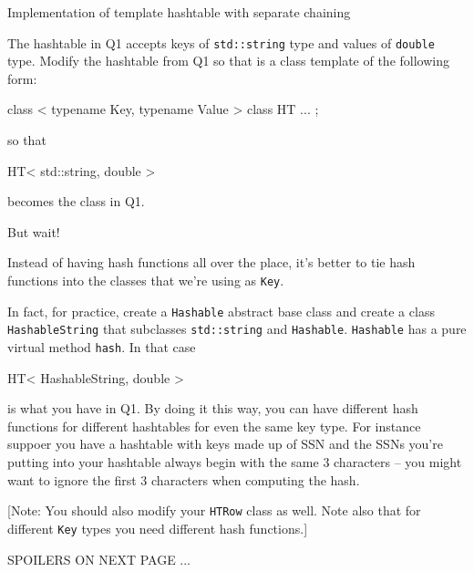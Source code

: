 Implementation of template hashtable with separate chaining

The hashtable in Q1 accepts keys of \verb!std::string! type
and values of \verb!double! type.
Modify the hashtable from Q1 so that is a class template of the following
form:
\begin{console}
class < typename Key, typename Value >
class HT
{
    ...
};
\end{console}
so that
\begin{console}
HT< std::string, double >
\end{console}
becomes the class in Q1.

But wait!

Instead of having hash functions all over the place, it's better to tie
hash functions into the classes that we're using as \verb!Key!.

In fact, for practice, create a \verb!Hashable! abstract base class
and create a class \verb!HashableString! that subclasses
\verb!std::string! and \verb!Hashable!.
\verb!Hashable! has a pure virtual method \verb!hash!.
In that case
{\small
\begin{console}
HT< HashableString, double >
\end{console}
}
is what you have in Q1.
By doing it this way, you can have different hash functions
for different hashtables for even the same key type.
For instance suppoer you have a hashtable with keys 
made up of SSN and the SSNs you're putting into your hashtable
always begin with the same 3 characters -- you might want to ignore
the first 3 characters when computing the hash.

[Note: You should also modify your \verb!HTRow! class as well.
Note also that for different \verb!Key! types you need different
hash functions.]

SPOILERS ON NEXT PAGE ...
